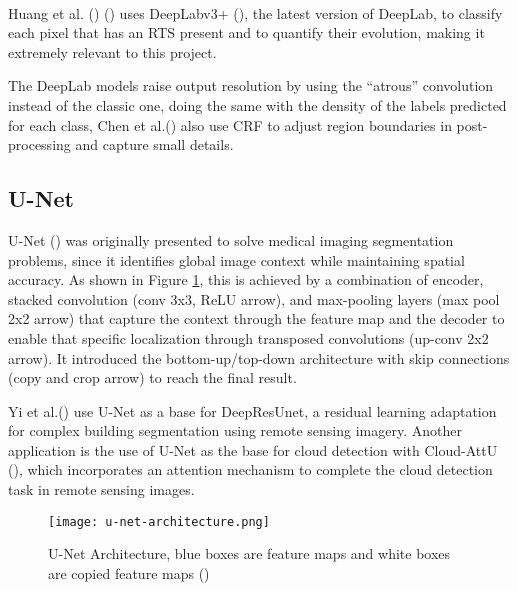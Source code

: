 \paragraph{}
Huang et al. (\cite{HUANG2020111534}) (\cite{HUANG2021102399}) uses DeepLabv3+ (\cite{Chen_2018_ECCV}), the latest version of DeepLab, to classify each pixel that has an \gls{RTS} present and to quantify their evolution, making it extremely relevant to this project.

The DeepLab models raise output resolution by using the “atrous” convolution instead of the classic one, doing the same with the density of the labels predicted for each class, Chen et al.(\cite{chen2016semantic}) also use \gls{CRF} to adjust region boundaries in post-processing and capture small details.

\subsection{U-Net}
U-Net (\cite{ronneberger2015unet}) was originally presented to solve medical imaging segmentation problems, since it identifies global image context while maintaining spatial accuracy. As shown in Figure \ref{fig_unet}, this is achieved by a combination of encoder, stacked convolution (conv 3x3, \gls{ReLU} arrow), and max-pooling layers (max pool 2x2 arrow) that capture the context through the feature map and the decoder to enable that specific localization through transposed convolutions (up-conv 2x2 arrow). It introduced the bottom-up/top-down architecture with skip connections (copy and crop arrow) to reach the final result.

Yi et al.(\cite{rs11151774}) use U-Net as a base for DeepResUnet, a residual learning adaptation for complex building segmentation using remote sensing imagery. Another application is the use of U-Net as the base for cloud detection with Cloud-AttU (\cite{sym12061056}), which incorporates an attention mechanism to complete the cloud detection task in remote sensing images.

    \begin{figure}[hbt!]
        \centering
        \texttt{[image: u-net-architecture.png]}
        \caption{U-Net Architecture, blue boxes are feature maps and white boxes are copied feature maps (\cite{ronneberger2015unet})}
        \label{fig_unet}
    \end{figure}